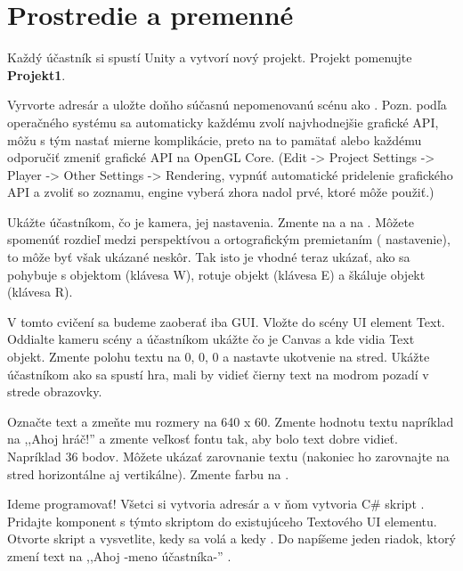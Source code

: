 \chapter{Prostredie a premenné}

Každý účastník si spustí Unity a vytvorí nový projekt. Projekt pomenujte \textbf{Projekt1}.

Vyrvorte adresár  a uložte doňho súčasnú nepomenovanú scénu ako . Pozn. podľa operačného systému sa automaticky každému zvolí najvhodnejšie grafické API, môžu s tým nastať mierne komplikácie, preto na to pamätať alebo každému odporučiť zmeniť grafické API na OpenGL Core. (Edit -> Project Settings -> Player -> Other Settings -> Rendering, vypnúť automatické pridelenie grafického API a zvoliť so zoznamu, engine vyberá zhora nadol prvé, ktoré môže použiť.)

Ukážte účastníkom, čo je kamera, jej nastavenia. Zmente  na   a  na . Môžete spomenúť rozdieľ medzi perspektívou a ortografickým premietaním ( nastavenie), to môže byť však ukázané neskôr. Tak isto je vhodné teraz ukázať, ako sa pohybuje s objektom (klávesa W), rotuje objekt (klávesa E) a škáluje objekt (klávesa R).

V tomto cvičení sa budeme zaoberať iba GUI. Vložte do scény UI element Text. Oddialte kameru scény a účastníkom ukážte čo je Canvas a kde vidia Text objekt. Zmente polohu textu na 0, 0, 0 a nastavte ukotvenie na stred. Ukážte účastníkom ako sa spustí hra, mali by vidieť čierny text na modrom pozadí v strede obrazovky.

Označte text a zmeňte mu rozmery na 640 x 60. Zmente hodnotu textu napríklad na ,,Ahoj hráč!'' a zmente veľkosť fontu tak, aby bolo text dobre vidieť. Napríklad 36 bodov. Môžete ukázať zarovnanie textu (nakoniec ho zarovnajte na stred horizontálne aj vertikálne). Zmente farbu na .

Ideme programovať! Všetci si vytvoria adresár  a v ňom vytvoria C\# skript . Pridajte komponent s týmto skriptom do existujúceho Textového UI elementu. Otvorte skript a vysvetlite, kedy sa volá  a kedy . Do  napíšeme jeden riadok, ktorý zmení text na ,,Ahoj -meno účastníka-'' .

\clearpage


